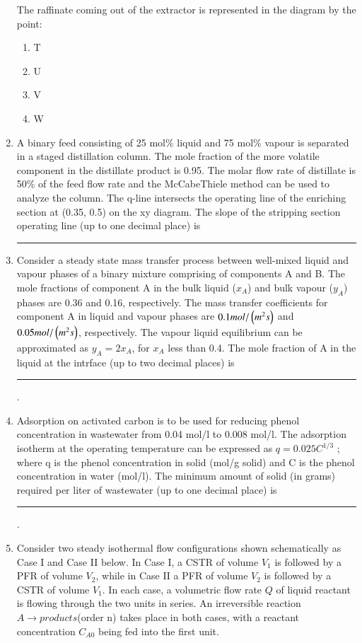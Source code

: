 \documentclass[journal,12pt,onecolumn]{IEEEtran}
\theoremstyle{remark}
\begin{document}
\begin{enumerate}
The raffinate coming out of the extractor is represented in the diagram by the point:

\hfill{}
\begin{enumerate}
    \item T
    \item U
    \item V
    \item W
\end{enumerate}

\item A binary feed consisting of 25 mol\% liquid and 75 mol\% vapour is separated in a staged distillation column. The mole fraction of the more volatile component in the distillate product is 0.95. The molar flow rate of distillate is 50\% of the feed flow rate and the McCabe\-Thiele method can be used to analyze the column. The q-line intersects the operating line of the enriching section at (0.35, 0.5) on the x\-y diagram. The slope of the stripping section operating line (up to one decimal place) is  \rule{40pt}{0.1mm}

\hfill{}
\item Consider a steady state mass transfer process between well-mixed liquid and vapour phases of a binary mixture comprising of components A and B. The mole fractions of component A in the bulk liquid ($x_A$) and bulk vapour ($y_A$) phases are 0.36 and 0.16, respectively. The mass transfer coefficients for component A in liquid and vapour phases are $0.1mol/\left(m^2s\right)$ and $0.05 mol/\left(m^2s\right)$, respectively. The vapour liquid equilibrium can be approximated as $y_A = 2 x_A$, for $x_A$ less than 0.4.
The mole fraction of A in the liquid at the intrface (up to two decimal places) is \rule{40pt}{0.1mm}.

\hfill{}
\item Adsorption on activated carbon is to be used for reducing phenol concentration in wastewater from 0.04 mol/l to 0.008 mol/l. The adsorption isotherm at the operating temperature can be expressed as $q = 0.025C^{1/3}$ ; where q is the phenol concentration in solid (mol/g solid) and C is the phenol concentration in water (mol/l). The minimum amount of solid (in grams) required per liter of wastewater (up to one decimal place) is  \rule{40pt}{0.1mm}.

\hfill{}
\item Consider two steady isothermal flow configurations shown schematically as Case I and Case II below. In Case I, a CSTR of volume $V_1$ is followed by a PFR of volume $V_2$, while in Case II a PFR of volume $V_2$ is followed by a CSTR of volume $V_1$. In each case, a volumetric flow rate $Q$ of liquid reactant is flowing through the two units in series. An irreversible reaction $A \to products$(order n) takes place in both cases, with a reactant concentration $C_{A0}$ being fed into the first unit. 


\end{enumerate}
\end{document}
